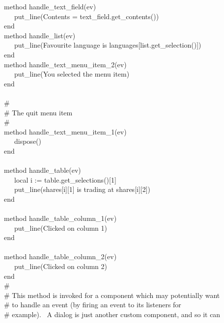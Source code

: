 {\>   method handle\_text\_field(ev) \\
\>   \ \ \ put\_line({\textquotedbl}Contents = {\textquotedbl}
{\textbar}{\textbar} text\_field.get\_contents()) \\
\>   end \\
\>   method handle\_list(ev) \\
\>   \ \ \ put\_line({\textquotedbl}Favourite language is
{\textquotedbl} {\textbar}{\textbar} languages[list.get\_selection()]) \\
\>   end \\
\>   method handle\_text\_menu\_item\_2(ev) \\
\>   \ \ \ put\_line({\textquotedbl}You selected the menu
item{\textquotedbl}) \\
\>   end \\
\ \\
\>   \# \\
\>   \# The quit menu item \\
\>   \# \\
\>   method handle\_text\_menu\_item\_1(ev) \\
\>   \ \ \ dispose() \\
\>   end \\
\ \\
\>   method handle\_table(ev) \\
\>   \ \ \ local i := table.get\_selections()[1] \\
\>   \ \ \ put\_line(shares[i][1] {\textbar}{\textbar} {\textquotedbl}
is trading at {\textquotedbl} {\textbar}{\textbar} shares[i][2]) \\
\>   end \\
\ \\
\>   method handle\_table\_column\_1(ev) \\
\>   \ \ \ put\_line({\textquotedbl}Clicked on column
1{\textquotedbl}) \\
\>   end \\
\ \\
\>   method handle\_table\_column\_2(ev) \\
\>   \ \ \ put\_line({\textquotedbl}Clicked on column
2{\textquotedbl}) \\
\>   end
\ \\
\>   \# \\
\>   \# This method is invoked for a component which may potentially want \\
\>   \# to handle an event (by firing an event to its listeners for\\
\>   \# example). \ A dialog is just another custom component, and so it can\\
}
